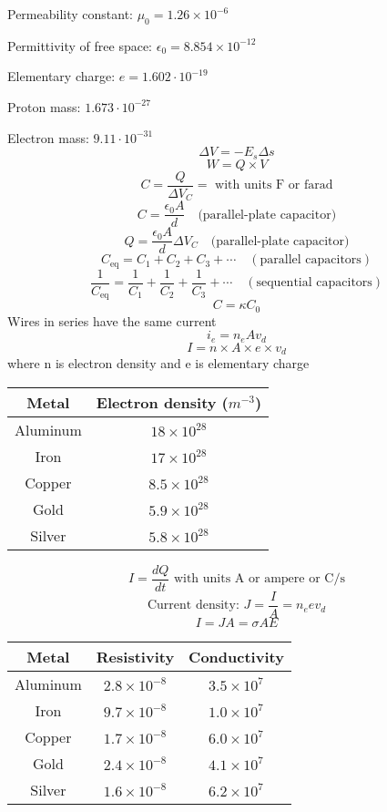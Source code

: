 \documentclass[twocolumn]{article}
\begin{document}
Permeability constant: $\mu_0 = 1.26\times 10^{-6}$

Permittivity of free space: $\epsilon_0 = 8.854\times 10^{-12}$

Elementary charge: $e = 1.602\cdot 10^{-19}$

Proton mass: $1.673\cdot 10^{-27}$

Electron mass: $9.11\cdot 10^{-31}$
\[\Delta V=-E_s\Delta s\]
\[W=Q\times V\]
\[C=\frac{Q}{\Delta V_C}= \text{ with units F or farad}\]
\[C=\frac{\epsilon_0 A}{d}\quad\text{(parallel-plate capacitor)}\]
\[Q=\frac{\epsilon_0 A}{d}\Delta V_C\quad\text{(parallel-plate capacitor)}\]
\[C_\text{eq}=C_1 + C_2 + C_3 + \cdots\quad (\text{parallel capacitors})\]
\[\frac{1}{C_\text{eq}}=\frac{1}{C_1} + \frac{1}{C_2} + \frac{1}{C_3} + \cdots\quad
(\text{sequential capacitors})\]
\[C=\kappa C_0\]
Wires in series have the same current
\[i_e = n_e Av_d\]
\[I=n\times A\times e\times v_d\] where n is electron density and e is elementary charge
\begin{center}
    \begin{tabular}{|c c|} 
        \hline
        Metal & Electron density ($m^{-3}$) \\ [0.5ex]
        \hline
        Aluminum & $18\times 10^{28}$ \\
        \hline
        Iron & $17\times 10^{28}$ \\
        \hline
        Copper & $8.5\times 10^{28}$ \\
        \hline
        Gold & $5.9\times 10^{28}$ \\
        \hline
        Silver & $5.8\times 10^{28}$ \\
        \hline
    \end{tabular}
\end{center}
\[I=\frac{dQ}{dt} \text{ with units A or ampere or C/s}\]
\[\text{Current density: } J=\frac{I}{A}=n_e e v_d\]
\[I=JA=\sigma AE\]
\begin{center}
    \begin{tabular}{|c c c|} 
        \hline
        Metal & Resistivity & Conductivity \\ [0.5ex]
        \hline
        Aluminum & $2.8\times 10^{-8}$ & $3.5\times 10^7$ \\
        \hline
        Iron & $9.7\times 10^{-8}$ & $1.0\times 10^7$ \\
        \hline
        Copper & $1.7 \times 10^{-8}$ & $6.0\times 10^7$ \\
        \hline
        Gold & $2.4\times 10^{-8}$ & $4.1\times 10^7$ \\
        \hline
        Silver & $1.6\times 10^{-8}$ & $6.2\times 10^7$ \\
        \hline
    \end{tabular}
\end{center}
\end{document}
